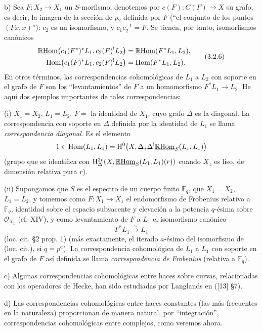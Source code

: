 b) Sea $F:X_2\to X_1$ un $S$-morfismo, denotemos por $c(F):C(F)\to X$ su grafo, es decir, la imagen de la sección de $p_2$ definida por $F$ (``el conjunto de los puntos $(Fx,x)$''): $c_2$ es un isomorfismo, y $c_1c_2^{-1}=F$. Se tienen, por tanto, isomorfismos canónicos
\begin{equation}
\begin{aligned}
\underline{\mathbb{R}\mathrm{Hom}}\bigl(c_1(F^*)^*L_1,c_2(F)^!L_2\bigr)&=\underline{\mathbb{R}\mathrm{Hom}}(F^*L_1,L_2),\\
\operatorname{Hom}\bigl(c_1(F)^*L_1,c_2(F)^!L_2\bigr)&=\operatorname{Hom}(F^*L_1,L_2).
\end{aligned}
\tag{3.2.6}
\end{equation}
En otros términos, las correspondencias cohomológicas de $L_1$ a $L_2$ con soporte en el grafo de $F$ son los ``levantamientos'' de $F$ a un homomorfismo $F^*L_1\to L_2$. He aquí dos ejemplos importantes de tales correspondencias:

(i) $X_1=X_2$, $L_1=L_2$, $F=$ la identidad de $X_1$, cuyo grafo $\Delta$ es la diagonal. La correspondencia con soporte en $\Delta$ definida por la identidad de $L_1$ se llama \emph{correspondencia diagonal}. Es el elemento
\[
1\in \operatorname{Hom}(L_1,L_1)=\mathrm{H}^0\bigl(X,\Delta_*\Delta^!\underline{\mathbb{R}\mathrm{Hom}}_S(L_1,L_1)\bigr)
\]
(grupo que se identifica con $\mathrm{H}^{2r}_\Delta(X,\underline{\mathbb{R}\mathrm{Hom}}_S(L_1,L_1)(r))$ cuando $X_1$ es liso, de dimensión relativa pura $r$).

(ii) Supongamos que $S$ es el espectro de un cuerpo finito $\mathbb F_q$, que $X_1=X_2$, $L_1=L_2$, y tomemos como $F:X_1\to X_1$ el endomorfismo de Frobenius relativo a $\mathbb F_q$, identidad sobre el espacio subyacente y elevación a la potencia $q$-ésima sobre $\mathcal O_{X_1}$ (cf. XIV), y como levantamiento de $F$ a $L_1$ el isomorfismo canónico
\[
F^*L_1\xrightarrow{\sim}L_1
\]
(loc. cit. §2 prop. 1) (más exactamente, el iterado $a$-ésimo del isomorfismo de (loc. cit.), si $q=p^a$). La correspondencia cohomológica de $L_1$ a $L_1$ con soporte en el grafo de $F$ así definida se llama \emph{correspondencia de Frobenius} (relativa a $\mathbb F_q$).

c) Algunas correspondencias cohomológicas entre haces sobre curvas, relacionadas con los operadores de Hecke, han sido estudiadas por Langlands en ([13] §7).

d) Las correspondencias cohomológicas entre haces constantes (las más frecuentes en la naturaleza) proporcionan de manera natural, por ``integración'', correspondencias cohomológicas entre complejos, como veremos ahora.
